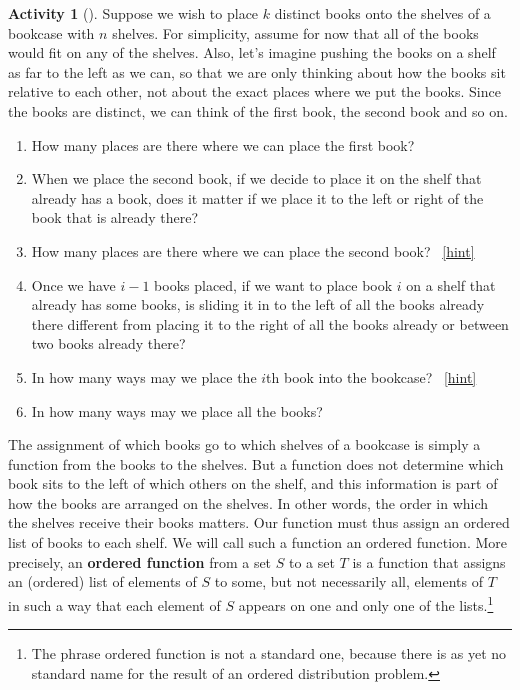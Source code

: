 \documentclass[10pt,]{book}
\newcommand{\terminology}[1]{\textbf{#1}}
\theoremstyle{plain}
\theoremstyle{definition}
\theoremstyle{definition}
\theoremstyle{definition}
\newtheorem{activity}[project]{Activity}
\numberwithin{equation}{chapter}
\begin{document}
\begin{activity}[]\label{bookcase}
\hypertarget{p-388}{}%
Suppose we wish to place \(k\) distinct books onto the shelves of a bookcase with \(n\) shelves. For simplicity, assume for now that all of the books would fit on any of the shelves. Also, let's imagine pushing the books on a shelf as far to the left as we can, so that we are only thinking about how the books sit relative to each other, not about the exact places where we put the books. Since the books are distinct, we can think of the first book, the second book and so on.%
\begin{enumerate}[font=\bfseries,label=(\alph*),ref=\alph*]
\item\label{task-92} \hypertarget{p-389}{}%
How many places are there where we can place the first book?%
\item\label{task-93} \hypertarget{p-391}{}%
When we place the second book, if we decide to place it on the shelf that already has a book, does it matter if we place it to the left or right of the book that is already there?%
\item\label{task-94} \hypertarget{p-393}{}%
How many places are there where we can place the second book?%
~\hfill{\tiny\hyperlink{a-62.c}{[hint]}\hypertarget{q-62.c}{}}\item\label{task-95} \hypertarget{p-396}{}%
Once we have \(i-1\) books placed, if we want to place book \(i\)  on a shelf that already has some books, is sliding it in to the left of all the books already there different from placing it to the right of all the books already or between two books already there?%
\item\label{task-96} \hypertarget{p-398}{}%
In how many ways may we place the \(i\)th book into the bookcase?%
~\hfill{\tiny\hyperlink{a-62.e}{[hint]}\hypertarget{q-62.e}{}}\item\label{task-97} \hypertarget{p-401}{}%
In how many ways may we place all the books?%
\end{enumerate}
\end{activity}
\hypertarget{p-403}{}%
The assignment of which books go to which shelves of a bookcase is simply a function from the books to the shelves. But a function does not determine which book sits to the left of which others on the shelf, and this information is part of how the books are arranged on the shelves. In other words, the order in which the shelves receive their books matters.  Our function must thus assign an ordered list of books to each shelf. We will call such a function an ordered function. More precisely, an \terminology{ordered function} from a set \(S\) to a set \(T\) is a function that assigns an (ordered) list of elements of \(S\) to some, but not necessarily all, elements of \(T\) in such a way that each element of \(S\) appears on one and only one of the lists.\footnote{The phrase ordered function is not a standard one, because there is as yet no standard name for the result of an ordered distribution problem.\label{fn-2}}%
\end{document}
